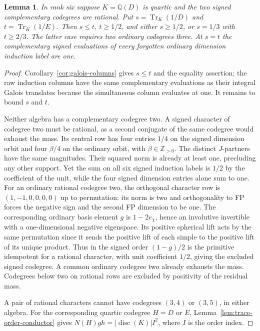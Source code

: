 \documentclass[11pt,reqno]{amsart}
\newtheorem{lemma}[theorem]{Lemma}
\theoremstyle{remark}\newtheorem{remark}[theorem]{Remark}
\numberwithin{equation}{section}
\begin{document}
\begin{lemma}\label{lem:quartic-rational-mass-strata}
In rank six suppose $K=\mathbb Q(D)$ is quartic and the two signed
complementary codegrees are rational. Put
$s=\operatorname{Tr}_K(1/D)$ and $t=\operatorname{Tr}_K(1/E)$.
Then $s\le t$, $t\ge1/2$, and either $s\ge1/2$, or $s=1/3$ with
$t\ge2/3$. The latter case requires two ordinary codegrees three.
At $s=t$ the complementary signed evaluations of every forgotten
ordinary dimension induction label are one.
\end{lemma}
\begin{proof}
Corollary~\ref{cor:galois-columns} gives $s\le t$ and the equality
assertion; the raw induction columns have the same complementary
evaluations as their integral Galois translates because the
simultaneous column evaluates at one. It remains to bound $s$ and $t$.

Neither algebra has a complementary codegree two. A signed
character of codegree two must be rational, as a second conjugate
of the same codegree would exhaust the mass. Its central row has
four entries $1/4$ on the signed dimension orbit and four
$\beta/4$ on the ordinary orbit, with $\beta\in\mathbb Z_{>0}$.
The distinct $J$-partners have the same magnitudes. Their squared
norm is already at least one, precluding any other support. Yet
the sum on all six signed induction labels is $1/2$ by the
coefficient of the unit, while the four signed dimension entries
alone sum to one. For an ordinary rational codegree two, the
orthogonal character row is $(1,-1,0,0,0,0)$ up to permutation:
its norm is two and orthogonality to FP forces the negative sign
and the second FP dimension to be one. The corresponding ordinary
basis element $g$ is $1-2e_\chi$, hence an involutive invertible
with a one-dimensional negative eigenspace. Its positive spherical
lift acts by the same permutation since it sends the positive lift
of each simple to the positive lift of its unique product. Thus in
the signed order $(1-g)/2$ is the primitive idempotent for a
rational character, with unit coefficient $1/2$, giving the
excluded signed codegree. A common ordinary codegree two already
exhausts the mass. Codegrees below two on rational rows are
excluded by positivity of the residual mass.

A pair of rational characters cannot have codegrees $(3,4)$ or
$(3,5)$, in either algebra. For the corresponding quartic
codegree $H=D$ or $E$, Lemma~\ref{lem:trace-order-conductor} gives
$N(H)gh=|\operatorname{disc}(K)|I^2$, where $I$ is the order index.


\end{proof}
\end{document}
